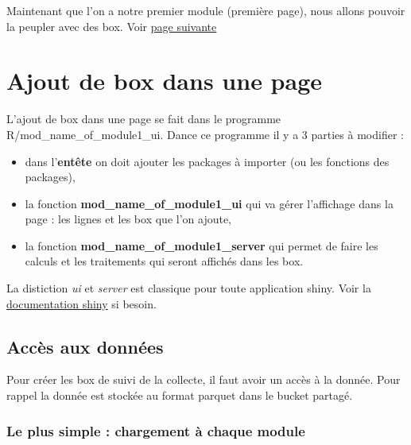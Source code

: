\documentclass[
  letterpaper,
  DIV=11,
  numbers=noendperiod]{scrreprt}
\providecommand{\tightlist}{%
  \setlength{\itemsep}{0pt}\setlength{\parskip}{0pt}}\usepackage{longtable,booktabs,array}
\begin{document}
Maintenant que l'on a notre premier module (première page), nous allons
pouvoir la peupler avec des box. Voir
\protect\hyperlink{ajout-de-box-dans-une-page}{page suivante}


\hypertarget{ajout-de-box-dans-une-page}{%
\chapter{Ajout de box dans une page}\label{ajout-de-box-dans-une-page}}

L'ajout de box dans une page se fait dans le programme
R/mod\_name\_of\_module1\_ui. Dance ce programme il y a 3 parties à
modifier :

\begin{itemize}
\tightlist
\item
  dans l'\textbf{entête} on doit ajouter les packages à importer (ou les
  fonctions des packages),\\
\item
  la fonction \textbf{mod\_name\_of\_module1\_ui} qui va gérer
  l'affichage dans la page : les lignes et les box que l'on ajoute,\\
\item
  la fonction \textbf{mod\_name\_of\_module1\_server} qui permet de
  faire les calculs et les traitements qui seront affichés dans les box.
\end{itemize}

La distiction \emph{ui} et \emph{server} est classique pour toute
application shiny. Voir la
\href{https://shiny.posit.co/r/getstarted/shiny-basics/lesson1/}{documentation
shiny} si besoin.

\hypertarget{accuxe8s-aux-donnuxe9es}{%
\section{Accès aux données}\label{accuxe8s-aux-donnuxe9es}}

Pour créer les box de suivi de la collecte, il faut avoir un accès à la
donnée. Pour rappel la donnée est stockée au format parquet dans le
bucket partagé.

\hypertarget{le-plus-simple-chargement-uxe0-chaque-module}{%
\subsection{Le plus simple : chargement à chaque
module}\label{le-plus-simple-chargement-uxe0-chaque-module}}
\end{document}
